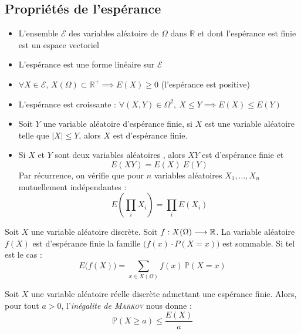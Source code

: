 \documentclass[11pt,a4paper,fleqn,pdftex]{report}
\begin{document}
\subsection{Propriétés de l'espérance} %
\label{sub:esperance_proprietes}
\begin{prop}
     \begin{itemize}
         \item L'ensemble $\mathscr{E}$ des variables aléatoire de $\Omega$ dans $\mathbb{R}$ et dont l'espérance est finie est un espace vectoriel
         \item L'espérance est une forme linéaire sur $\mathscr{E}$
         \item $\forall X \in \mathscr{E},\, X(\Omega) \subset \mathbb{R}^+ \implies E(X) \ge 0$ (l'espérance est positive)
         \item L'espérance est croissante : $\forall (X,Y)\in \Omega^2,\: X \le Y \implies E(X) \le E(Y)$
         \item Soit $Y$ une variable aléatoire d'espérance finie, si $X$ est une variable aléatoire telle que $|X| \le Y$, alors $X$ est d'espérance finie.
         \item Si $X$ et $Y$ sont deux variables aléatoires  , alors $XY$ est d'espérance finie et 
         \begin{equation*}
         E(XY) = E(X)\: E(Y)
         \end{equation*}
         Par récurrence, on vérifie que pour $n$ variables aléatoires $X_1,\ldots, X_n$ mutuellement indépendantes : 
         \begin{equation*}
              E \left( \prod_i X_i \right)  = \prod_i E(X_i)
         \end{equation*}
     \end{itemize}
\end{prop}
\begin{itheorem}
     Soit $X$ une variable aléatoire discrète.\newline
     Soit $f : X(\Omega ) \longrightarrow \mathbb{R}{}$.\newline
     La variable aléatoire $f(X)$ est d'espérance finie \ssi{} la famille $\Big( f(x) \cdot P(X = x) \Big)$ est sommable. Si tel est le cas : 
     \begin{equation}
     E\big( f(X) \big) = \sum_{x\in X(\Omega)} f(x)\, \mathbb{P}(X=x)
     \end{equation}
\end{itheorem}
\begin{itheorem}\label{thm:markov}
     Soit $X$ une variable aléatoire réelle discrète  admettant une espérance finie. Alors, pour tout $a > 0$, l'\emph{inégalite de \textsc{Markov}} nous donne : 
     \begin{equation}\label{eq:markov}
     \mathbb{P}(X\ge a) \le \dfrac{E(X)}{a}
     \end{equation}
\end{itheorem}
\end{document}
